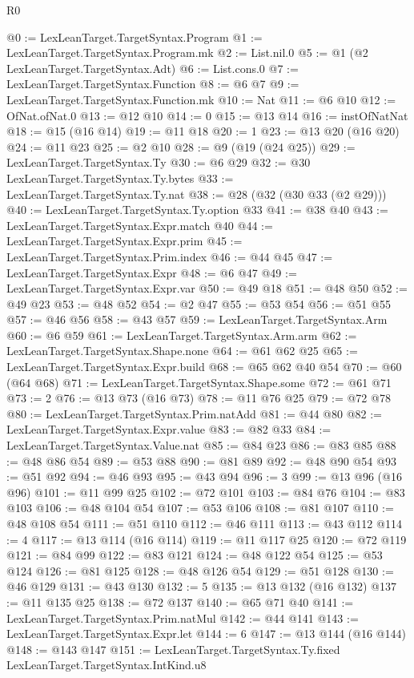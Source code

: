 \begin{lexlean}{R0}
\begin{coremodule}
{{{{{@0 := LexLeanTarget.TargetSyntax.Program
@1 := LexLeanTarget.TargetSyntax.Program.mk
@2 := List.nil.{0}
@5 := @1 (@2 LexLeanTarget.TargetSyntax.Adt)
@6 := List.cons.{0}
@7 := LexLeanTarget.TargetSyntax.Function
@8 := @6 @7
@9 := LexLeanTarget.TargetSyntax.Function.mk
@10 := Nat
@11 := @6 @10
@12 := OfNat.ofNat.{0}
@13 := @12 @10
@14 := 0
@15 := @13 @14
@16 := instOfNatNat
@18 := @15 (@16 @14)
@19 := @11 @18
@20 := 1
@23 := @13 @20 (@16 @20)
@24 := @11 @23
@25 := @2 @10
@28 := @9 (@19 (@24 @25))
@29 := LexLeanTarget.TargetSyntax.Ty
@30 := @6 @29
@32 := @30 LexLeanTarget.TargetSyntax.Ty.bytes
@33 := LexLeanTarget.TargetSyntax.Ty.nat
@38 := @28 (@32 (@30 @33 (@2 @29)))
@40 := LexLeanTarget.TargetSyntax.Ty.option @33
@41 := @38 @40
@43 := LexLeanTarget.TargetSyntax.Expr.match @40
@44 := LexLeanTarget.TargetSyntax.Expr.prim
@45 := LexLeanTarget.TargetSyntax.Prim.index
@46 := @44 @45
@47 := LexLeanTarget.TargetSyntax.Expr
@48 := @6 @47
@49 := LexLeanTarget.TargetSyntax.Expr.var
@50 := @49 @18
@51 := @48 @50
@52 := @49 @23
@53 := @48 @52
@54 := @2 @47
@55 := @53 @54
@56 := @51 @55
@57 := @46 @56
@58 := @43 @57
@59 := LexLeanTarget.TargetSyntax.Arm
@60 := @6 @59
@61 := LexLeanTarget.TargetSyntax.Arm.arm
@62 := LexLeanTarget.TargetSyntax.Shape.none
@64 := @61 @62 @25
@65 := LexLeanTarget.TargetSyntax.Expr.build
@68 := @65 @62 @40 @54
@70 := @60 (@64 @68)
@71 := LexLeanTarget.TargetSyntax.Shape.some
@72 := @61 @71
@73 := 2
@76 := @13 @73 (@16 @73)
@78 := @11 @76 @25
@79 := @72 @78
@80 := LexLeanTarget.TargetSyntax.Prim.natAdd
@81 := @44 @80
@82 := LexLeanTarget.TargetSyntax.Expr.value
@83 := @82 @33
@84 := LexLeanTarget.TargetSyntax.Value.nat
@85 := @84 @23
@86 := @83 @85
@88 := @48 @86 @54
@89 := @53 @88
@90 := @81 @89
@92 := @48 @90 @54
@93 := @51 @92
@94 := @46 @93
@95 := @43 @94
@96 := 3
@99 := @13 @96 (@16 @96)
@101 := @11 @99 @25
@102 := @72 @101
@103 := @84 @76
@104 := @83 @103
@106 := @48 @104 @54
@107 := @53 @106
@108 := @81 @107
@110 := @48 @108 @54
@111 := @51 @110
@112 := @46 @111
@113 := @43 @112
@114 := 4
@117 := @13 @114 (@16 @114)
@119 := @11 @117 @25
@120 := @72 @119
@121 := @84 @99
@122 := @83 @121
@124 := @48 @122 @54
@125 := @53 @124
@126 := @81 @125
@128 := @48 @126 @54
@129 := @51 @128
@130 := @46 @129
@131 := @43 @130
@132 := 5
@135 := @13 @132 (@16 @132)
@137 := @11 @135 @25
@138 := @72 @137
@140 := @65 @71 @40
@141 := LexLeanTarget.TargetSyntax.Prim.natMul
@142 := @44 @141
@143 := LexLeanTarget.TargetSyntax.Expr.let
@144 := 6
@147 := @13 @144 (@16 @144)
@148 := @143 @147
@151 := LexLeanTarget.TargetSyntax.Ty.fixed LexLeanTarget.TargetSyntax.IntKind.u8
}}}}}
\end{coremodule}
\end{lexlean}
